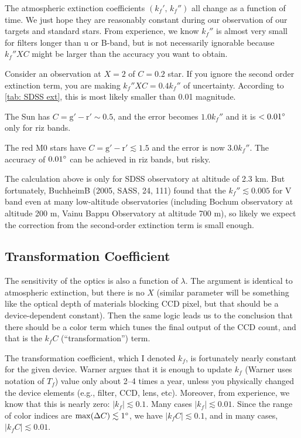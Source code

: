 The atmospheric extinction coefficients $ (k_f',\, k_f'') $ all change as a function of time. We just hope they are reasonably constant during our observation of our targets and standard stars. From experience, we know $ k_f'' $ is almost very small for filters longer than u or B-band, but is not necessarily ignorable because $ k_f'' XC $ might be larger than the accuracy you want to obtain. 

\begin{ex}
Consider an observation at $ X = 2 $ of $ C = 0.2 $ star. If you ignore the second order extinction term, you are making $ k_f'' XC = 0.4 k_f'' $ of uncertainty. According to \cref{tab: SDSS ext}, this is most likely smaller than 0.01 magnitude. 

The Sun has $ C = \mathrm{g' - r'} \sim 0.5 $, and the error becomes $ 1.0 k_f'' $ and it is $ < \m{0.01} $ only for riz bands.

The red M0 stars have $ C = \mathrm{g' - r'} \lesssim 1.5 $ and the error is now $ 3.0 k_f'' $. The accuracy of $ \m{0.01} $ can be achieved in riz bands, but risky.
\end{ex}

The calculation above is only for SDSS observatory at altitude of 2.3 km. But fortunately, BuchheimB (2005, SASS, 24, 111) found that the $ k_f'' \lesssim 0.005 $ for V band even at many low-altitude observatories (including Bochum observatory at altitude 200 m, Vainu Bappu Observatory at altitude 700 m), so likely we expect the correction from the second-order extinction term is small enough.


\subsection{Transformation Coefficient}
The sensitivity of the optics is also a function of $ \lambda $. The argument is identical to atmospheric extinction, but there is no $ X $ (similar parameter will be something like the optical depth of materials blocking CCD pixel, but that should be a device-dependent constant). Then the same logic leads us to the conclusion that there should be a color term which tunes the final output of the CCD count, and that is the $ k_f C $ (``transformation'') term.

The transformation coefficient, which I denoted $ k_f $, is fortunately nearly constant for the given device. Warner argues that it is enough to update $ k_f $ (Warner uses notation of $ T_f $) value only about 2--4 times a year, unless you physically changed the device elements (e.g., filter, CCD, lens, etc). Moreover, from experience, we know that this is nearly zero: $ |k_f| \lesssim 0.1 $. Many cases $ |k_f| \lesssim 0.01 $. Since the range of color indices are $ \mathrm{max}(\Delta C) \lesssim \m{1} $, we have $ |k_f C| \lesssim 0.1 $, and in many cases, $ |k_f C| \lesssim 0.01 $.


